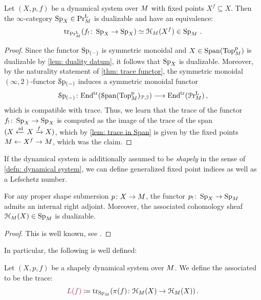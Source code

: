 \begin{lem}\label{lem: top trace identification}
    Let $(X,p,f)$ be a dynamical system over $M$ with
    fixed points $ X^f\subseteq X$. Then the $\infty$-category $\pSp{X}\in \pPrl{\base}$
    is dualizable and have an equivalence:
    \[ \tr{f_!\colon \pSp{X}\to \pSp{X}}{\pPrl{\base}}\simeq \cptSec{X^f}[\base]\in \pSp{\base}\,.\]
\end{lem}
\begin{proof}
  Since the functor $\pSp{(-)}$ is symmetric monoidal and $X\in \operatorname{\mathrm{Span}}({\mathrm{Top}^{\mathrm{p}}_{M}})$ is
  dualizable by \cref{lem: duality datum}, it follows that $\pSp{X}$
  is dualizable.
  Moreover, by the naturality statement of \cref{thm: trace functor}, the symmetric monoidal 
  $(\infty,2)$-functor $\pSpf{(-)}$ induces a symmetric monoidal functor 
  \[ \pSpf{(-)}\colon \Endtrl(\sSpan{\pTop{\base}}_{\cP,\cI}) 
  \too \Endtrl(\pPrlf{\base})\,,\]
  which is compatible with trace. Thus, we learn that 
 the trace of the functor $f_!\colon \pSp{X}\to \pSp{X}$
 is computed as the image of the trace of the span 
 $(X\xleftarrow{\operatorname{id}} X \xrightarrow{f}X)$, which by \cref{lem: trace in Span}
 is given by the fixed points $M \leftarrow X^f \to M$,
 which was the claim. 
\end{proof}

If the dynamical system is additionally assumed to be \emph{shapely} in the sense
of \autoref{defn: dynamical system}, we can define generalized fixed point
indices as well as a Lefschetz number. 

\begin{lem}\label{lem: proper shape submersion implies internal adjoint}
  For any proper shape submersion $p\colon X\to M$, the functor $p_!\colon \pSp{X} \to \pSp{\base}$
  admits an internal right adjoint. 
  Moreover, the associated cohomology sheaf $\cptSec{X}[\base] \in \pSp{\base}$ is dualizable.
\end{lem}
\begin{proof}
  This is well known, see \cite{Volpe2023}.
\end{proof}

In particular, the following is well defined:

\begin{defn}\label{defn: Lefschetz class}
 Let $(X,p,f)$ be a shapely dynamical system over $M$. We define the associated
  to be the trace:
 \[ \mdef{L(f)}\coloneq \tr{\pb{f} \colon \cptSec{X}[\base] 
 \to \cptSec{X}[\base]}{\pSp{\base}}\,.\]
\end{defn}

